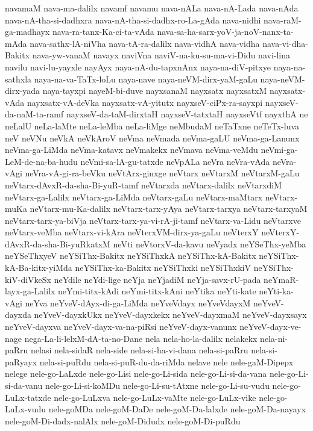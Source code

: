 {navamaM
nava-ma-dalilx
navamf
navamu
nava-nALa
nava-nA-Lada
nava-nAda
nava-nA-tha-si-dadhxra
nava-nA-tha-si-dadhx-ro-La-gAda
nava-nidhi
nava-raM-ga-madhayx
nava-ra-tanx-Ka-ci-ta-vAda
nava-sa-ha-sarx-yoV-ja-noV-nanx-ta-mAda
nava-sathx-lA-niVha
nava-tA-ra-dalilx
nava-vidhA
nava-vidha
nava-vi-dha-Bakitx
nava-yw-vanaM
navayx
naviVna
naviV-na-ku-su-ma-vi-Didu
navi-lina
navilu
navi-lu-yayxle
nayAyx
naya-nA-du-tapxnAnx
naya-na-diV-pitxye
naya-na-sathxla
naya-na-va-TaTx-loLu
naya-nave
naya-neVM-dirx-yaM-gaLu
naya-neVM-dirx-yada
naya-tayxpi
nayeM-bi-duve
nayxsanaM
nayxsatx
nayxsatxM
nayxsatx-vAda
nayxsatx-vA-deVka
nayxsatx-vA-yitutx
nayxseV-ciPx-ra-sayxpi
nayxseV-da-naM-ta-ramf
nayxseV-da-taM-dirxtaH
nayxseV-tatxtaH
nayxseVtf
nayxthA
ne
neLalU
neLa-laMte
neLa-leMba
neLa-liMge
neMbudaM
neTaTxne
neTeTx-luva
neV
neVNu
neVkA
neVkAroV
neVma
neVmada
neVma-gaLU
neVma-ga-Lanunx
neVma-ga-LiMda
neVma-katavx
neVmakekx
neVmava
neVma-veMdu
neVmi-ga-LeM-de-na-ba-hudu
neVmi-sa-lA-gu-tatxde
neVpALa
neVra
neVra-vAda
neVra-vAgi
neVra-vA-gi-ra-beVku
neVtArx-ginxge
neVtarx
neVtarxM
neVtarxM-gaLu
neVtarx-dAvxR-da-sha-Bi-yuR-tamf
neVtarxda
neVtarx-dalilx
neVtarxdiM
neVtarx-ga-Lalilx
neVtarx-ga-LiMda
neVtarx-gaLu
neVtarx-maMtarx
neVtarx-muKa
neVtarx-mu-Ka-dalilx
neVtarx-tarx-yAya
neVtarx-tarxya
neVtarx-tarxyaM
neVtarx-tarx-ya-biVja
neVtarx-tarx-ya-vi-rA-ji-tamf
neVtarx-va-Lidu
neVtarxve
neVtarx-veMba
neVtarx-vi-kAra
neVterxVM-dirx-ya-gaLu
neVterxY
neVterxY-dAvxR-da-sha-Bi-yuRkatxM
neVti
neVtorxV-da-kavu
neVyadx
neYSeThx-yeMba
neYSeThxyeV
neYSiThx-Bakitx
neYSiThxkA
neYSiThx-kA-Bakitx
neYSiThx-kA-Ba-kitx-yiMda
neYSiThx-ka-Bakitx
neYSiThxki
neYSiThxkiV
neYSiThx-kiV-diVkeSx
neYdile
neYdi-lige
neYja
neYjadiM
neYja-savx-rU-pada
neYmaR-layx-ga-Lalilx
neYmi-titx-kAdi
neYmi-titx-kAni
neYtika
neYti-kate
neYti-ka-vAgi
neYva
neYveV-dAyx-di-ga-LiMda
neYveVdayx
neYveVdayxM
neYveV-dayxda
neYveV-dayxkUkx
neYveV-dayxkekx
neYveV-dayxmaM
neYveV-dayxsayx
neYveV-dayxva
neYveV-dayx-va-na-piRsi
neYveV-dayx-vanunx
neYveV-dayx-ve-nage
nega-La-li-lelxM-dA-ta-no-Dane
nela
nela-ho-la-dalilx
nelakekx
nela-ni-paRru
nelasi
nela-sidaR
nela-side
nela-si-ha-vi-dana
nela-si-paRru
nela-si-paRyayx
nela-si-puRdu
nela-si-puR-du-da-riMda
nelave
nele
nele-gaM-Dipepx
nelege
nele-go-LaLxde
nele-go-Lisi
nele-go-Li-sida
nele-go-Li-si-da-vana
nele-go-Li-si-da-vanu
nele-go-Li-si-koMDu
nele-go-Li-su-tAtxne
nele-go-Li-su-vudu
nele-go-LuLx-tatxde
nele-go-LuLxva
nele-go-LuLx-vaMte
nele-go-LuLx-vike
nele-go-LuLx-vudu
nele-goMDa
nele-goM-DaDe
nele-goM-Da-lalxde
nele-goM-Da-nayayx
nele-goM-Di-dadx-nalAlx
nele-goM-Didudx
nele-goM-Di-puRdu
}
